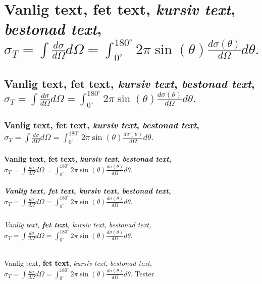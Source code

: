 \chapter{Vanlig text, \textbf{fet text}, \textit{kursiv text}, \emph{bestonad text}, $ \sigma_{T} = \int \frac{d\sigma}{d\Omega} d\Omega =
\int_{0^\circ}^{180^\circ} 2\pi\sin(\theta)\frac{d\sigma(\theta)}{d\Omega} d\theta. $}

\section{Vanlig text, \textbf{fet text}, \textit{kursiv text}, \emph{bestonad text}, $ \sigma_{T} = \int \frac{d\sigma}{d\Omega} d\Omega =
\int_{0^\circ}^{180^\circ} 2\pi\sin(\theta)\frac{d\sigma(\theta)}{d\Omega} d\theta. $}

\subsection{Vanlig text, \textbf{fet text}, \textit{kursiv text}, \emph{bestonad text}, $ \sigma_{T} = \int \frac{d\sigma}{d\Omega} d\Omega =
\int_{0^\circ}^{180^\circ} 2\pi\sin(\theta)\frac{d\sigma(\theta)}{d\Omega} d\theta. $}

\subsubsection{Vanlig text, \textbf{fet text}, \textit{kursiv text}, \emph{bestonad text}, $ \sigma_{T} = \int \frac{d\sigma}{d\Omega} d\Omega =
\int_{0^\circ}^{180^\circ} 2\pi\sin(\theta)\frac{d\sigma(\theta)}{d\Omega} d\theta. $}

\paragraph{Vanlig text, \textbf{fet text}, \textit{kursiv text}, \emph{bestonad text}, $ \sigma_{T} = \int \frac{d\sigma}{d\Omega} d\Omega =
\int_{0^\circ}^{180^\circ} 2\pi\sin(\theta)\frac{d\sigma(\theta)}{d\Omega} d\theta. $}

\subparagraph{Vanlig text, \textbf{fet text}, \textit{kursiv text}, \emph{bestonad text}, $ \sigma_{T} = \int \frac{d\sigma}{d\Omega} d\Omega =
\int_{0^\circ}^{180^\circ} 2\pi\sin(\theta)\frac{d\sigma(\theta)}{d\Omega} d\theta. $}
Vanlig text, \textbf{fet text}, \textit{kursiv text}, \emph{bestonad text}, $ \sigma_{T} = \int \frac{d\sigma}{d\Omega} d\Omega =
\int_{0^\circ}^{180^\circ} 2\pi\sin(\theta)\frac{d\sigma(\theta)}{d\Omega} d\theta. $
Tester


